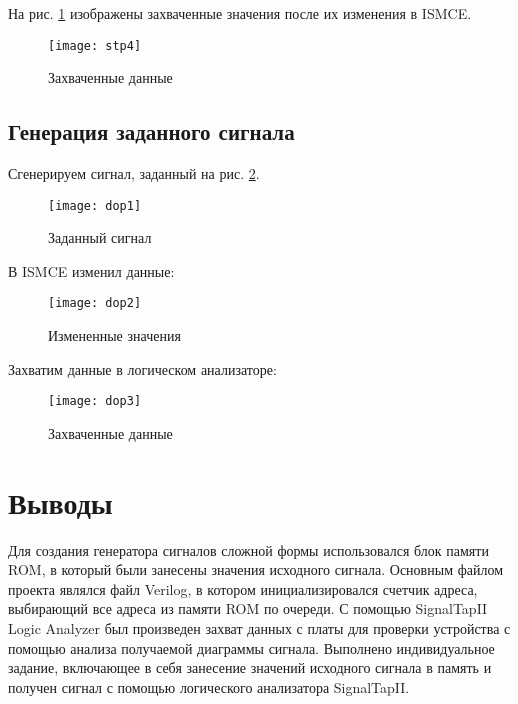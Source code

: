 На рис. \ref{fig:stp4} изображены захваченные значения после их изменения в ISMCE.
\begin{figure}[H]
	\centering
	\texttt{[image: stp4]}
	\caption{Захваченные данные}
	\label{fig:stp4}
\end{figure}

\subsection{Генерация заданного сигнала}

Сгенерируем сигнал, заданный на рис. \ref{fig:dop1}.
\begin{figure}[H]
	\centering
	\texttt{[image: dop1]}
	\caption{Заданный сигнал}
	\label{fig:dop1}
\end{figure}

В ISMCE изменил данные:
\begin{figure}[H]
	\centering
	\texttt{[image: dop2]}
	\caption{Измененные значения}
\end{figure}

Захватим данные в логическом анализаторе:
\begin{figure}[H]
	\centering
	\texttt{[image: dop3]}
	\caption{Захваченные данные}
\end{figure}

\section{Выводы}

Для создания генератора сигналов сложной формы использовался блок памяти ROM, в который были занесены значения исходного сигнала. Основным файлом проекта являлся файл Verilog, в котором инициализировался счетчик адреса, выбирающий все адреса из памяти ROM по очереди. С помощью SignalTapII Logic Analyzer был произведен захват данных с платы для проверки устройства с помощью анализа получаемой диаграммы сигнала. Выполнено индивидуальное задание, включающее в себя занесение значений исходного сигнала в память и получен сигнал с помощью логического анализатора SignalTapII.

